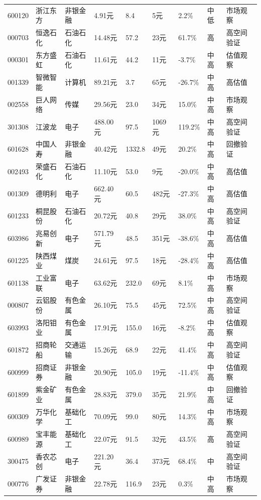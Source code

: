 \begin{longtable}{L{1.05cm}L{1.55cm}L{1.55cm}R{0.85cm}R{0.85cm}R{0.85cm}R{0.85cm}R{0.65cm}L{2.65cm}}
600120 & 浙江东方 & 非银金融 & 4.91元 & 8.4 & 5元 & 2.2\% & 中低 & 市场观察 \\
000703 & 恒逸石化 & 石油石化 & 14.48元 & 57.2 & 23元 & 61.7\% & 高 & 高空间验证 \\
000301 & 东方盛虹 & 石油石化 & 11.61元 & 44.2 & 11元 & -3.7\% & 中高 & 估值观察 \\
001339 & 智微智能 & 计算机 & 89.21元 & 3.7 & 65元 & -26.7\% & 中高 & 高估值 \\
002558 & 巨人网络 & 传媒 & 29.56元 & 23.0 & 34元 & 15.0\% & 中高 & 市场观察 \\
301308 & 江波龙 & 电子 & 488.00元 & 97.5 & 1069元 & 119.2\% & 中高 & 高空间验证 \\
601628 & 中国人寿 & 非银金融 & 40.42元 & 1332.8 & 49元 & 20.2\% & 中高 & 回撤验证 \\
002493 & 荣盛石化 & 石油石化 & 11.10元 & 53.0 & 9元 & -20.0\% & 中高 & 高估值 \\
001309 & 德明利 & 电子 & 662.40元 & 60.5 & 482元 & -27.3\% & 中高 & 高估值 \\
601233 & 桐昆股份 & 石油石化 & 20.72元 & 40.8 & 29元 & 38.0\% & 中高 & 高空间验证 \\
603986 & 兆易创新 & 电子 & 571.79元 & 48.5 & 351元 & -38.6\% & 中高 & 高估值 \\
601225 & 陕西煤业 & 煤炭 & 24.61元 & 97.5 & 18元 & -28.4\% & 中高 & 高估值 \\
601138 & 工业富联 & 电子 & 63.62元 & 232.0 & 69元 & 8.1\% & 中高 & 市场观察 \\
000807 & 云铝股份 & 有色金属 & 26.10元 & 75.5 & 45元 & 72.5\% & 中高 & 高空间验证 \\
603993 & 洛阳钼业 & 有色金属 & 17.91元 & 155.0 & 16元 & -8.2\% & 中高 & 估值观察 \\
601872 & 招商轮船 & 交通运输 & 15.26元 & 68.9 & 22元 & 41.4\% & 中高 & 高空间验证 \\
600999 & 招商证券 & 非银金融 & 20.90元 & 105.0 & 19元 & -11.4\% & 中高 & 估值观察 \\
601899 & 紫金矿业 & 有色金属 & 28.83元 & 379.0 & 35元 & 21.9\% & 中高 & 回撤验证 \\
600309 & 万华化学 & 基础化工 & 70.09元 & 99.0 & 80元 & 14.3\% & 中高 & 市场观察 \\
600989 & 宝丰能源 & 基础化工 & 22.07元 & 91.5 & 32元 & 43.5\% & 高 & 高空间验证 \\
300475 & 香农芯创 & 电子 & 221.20元 & 36.4 & 373元 & 68.4\% & 中 & 高空间验证 \\
000776 & 广发证券 & 非银金融 & 22.78元 & 116.9 & 23元 & 0.3\% & 中高 & 市场观察 \\

\end{longtable}
